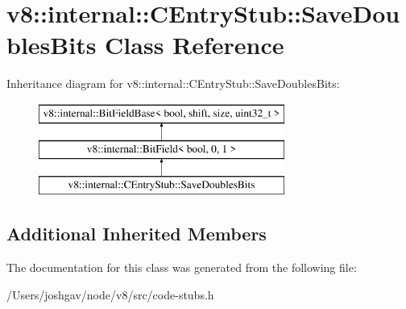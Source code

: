 \hypertarget{classv8_1_1internal_1_1_c_entry_stub_1_1_save_doubles_bits}{}\section{v8\+:\+:internal\+:\+:C\+Entry\+Stub\+:\+:Save\+Doubles\+Bits Class Reference}
\label{classv8_1_1internal_1_1_c_entry_stub_1_1_save_doubles_bits}
Inheritance diagram for v8\+:\+:internal\+:\+:C\+Entry\+Stub\+:\+:Save\+Doubles\+Bits\+:\begin{figure}[H]
\begin{center}
\leavevmode
\includegraphics[height=3.000000cm]{classv8_1_1internal_1_1_c_entry_stub_1_1_save_doubles_bits}
\end{center}
\end{figure}
\subsection*{Additional Inherited Members}


The documentation for this class was generated from the following file\+:\begin{DoxyCompactItemize}
\item 
/\+Users/joshgav/node/v8/src/code-\/stubs.\+h\end{DoxyCompactItemize}
